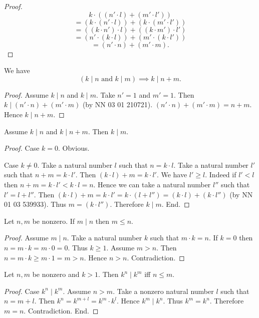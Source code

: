 \documentclass[../../natural-numbers.ftl.tex]{subfiles}
\begin{document}
\begin{forthel}
\begin{proof}
      \[   k \cdot ((n' \cdot l) + (m' \cdot l')) \]
      \[ = (k \cdot (n' \cdot l)) + (k \cdot (m' \cdot l')) \]
      \[ = ((k \cdot n') \cdot l) + ((k \cdot m') \cdot l') \]
      \[ = (n' \cdot (k \cdot l)) + (m' \cdot (k \cdot l')) \]
      \[ = (n' \cdot n) + (m' \cdot m). \]
    \end{proof}

    \begin{corollary}
      We have \[ (\text{$k \mid n$ and $k \mid m$}) \implies k \mid n + m. \]
    \end{corollary}
    \begin{proof}
      Assume $k \mid n$ and $k \mid m$.
      Take $n' = 1$ and $m' = 1$.
      Then $k \mid (n' \cdot n) + (m' \cdot m)$ (by NN 03 01 210721).
      $(n' \cdot n) + (m' \cdot m) = n + m$.
      Hence $k \mid n + m$.
    \end{proof}

    \begin{proposition}[NN 03 01 695362]
      Assume $k \mid n$ and $k \mid n + m$.
      Then $k \mid m$.
    \end{proposition}
    \begin{proof}
      Case $k = 0$. Obvious.

      Case $k \neq 0$.
        Take a natural number $l$ such that $n = k \cdot l$.
        Take a natural number $l'$ such that $n + m = k \cdot l'$.
        Then $(k \cdot l) + m = k \cdot l'$.
        We have $l' \geq l$.
        Indeed if $l' < l$ then $n + m = k \cdot l' < k \cdot l = n$.
        Hence we can take a natural number $l''$ such that $l' = l + l''$.
        Then $(k \cdot l) + m = k \cdot l' = k \cdot (l + l'') = (k \cdot l) + (k \cdot l'')$ (by NN 01 03 539933).
        Thus $m = (k \cdot l'')$.
        Therefore $k \mid m$.
      End.
    \end{proof}

    \begin{proposition}[NN 03 01 376821]
      Let $n,m$ be nonzero.
      If $m \mid n$ then $m \leq n$.
    \end{proposition}
    \begin{proof}
      Assume $m \mid n$.
      Take a natural number $k$ such that $m \cdot k = n$.
      If $k = 0$ then $n = m \cdot k = m \cdot 0 = 0$.
      Thus $k \geq 1$.
      Assume $m > n$.
      Then $n = m \cdot k \geq m \cdot 1 = m > n$.
      Hence $n > n$.
      Contradiction.
    \end{proof}

    \begin{proposition}[NN 03 01 499003]
      Let $n,m$ be nonzero and $k > 1$.
      Then $k^{n} \mid k^{m}$ iff $n \leq m$.
    \end{proposition}
    \begin{proof}
      Case $k^{n} \mid k^{m}$.
        Assume $n > m$.
        Take a nonzero natural number $l$ such that $n = m + l$.
        Then $k^{n} = k^{m + l} = k^{m} \cdot k^{l}$.
        Hence $k^{m} \mid k^{n}$.
        Thus $k^{m} = k^{n}$.
        Therefore $m = n$.
        Contradiction.
      End.


\end{proof}
\end{forthel}
\end{document}
